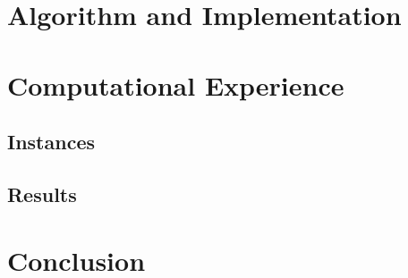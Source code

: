 \section{Algorithm and Implementation}

\section{Computational Experience}

\subsection{Instances}

\subsection{Results}

\section{Conclusion}

